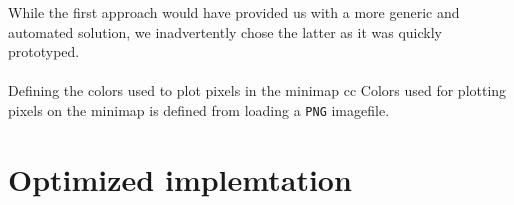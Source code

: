 While the first approach would have provided us with a more generic and
automated solution, we inadvertently chose the latter as it was quickly
prototyped.
\\
\\
Defining the colors used to plot pixels in the minimap cc
Colors used for plotting pixels on the minimap is defined from loading a
\texttt{PNG} imagefile.
\section{Optimized implemtation}

